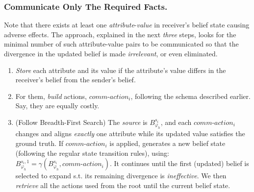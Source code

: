 \documentclass[letterpaper]{article} %
\begin{document}
    \subsubsection{Communicate Only The Required Facts.}
    Note that there exists at least one \textit{attribute}-\textit{value} in receiver's belief state causing adverse effects. 
    The approach, explained in the next \textit{three} steps, looks for the minimal number of such attribute-value pairs to be communicated so that
    the divergence in the updated belief is made \textit{irrelevant}, or even eliminated.
    \begin{enumerate}
        \item 
        \textit{Store} each attribute and its value if the attribute's value differs in the receiver's belief from the sender's belief. 
    
        \item For them, \textit{build} actions, $\textit{comm-action}_i$, following the schema described earlier. Say, they are equally costly.  
        
        \item 
        (Follow Breadth-First Search) 
        The \textit{source} is $B_{\varphi_h}^{s_i}$, and each $\textit{comm-action}_i$ changes and aligns \textit{exactly} one attribute while its updated value satisfies the ground truth. If $\textit{comm-action}_i$ is applied, generates a new belief state (following the regular state transition rules), using: $B_{\varphi_h}^{s_i,1} = \gamma(B_{\varphi_h}^{s_i}, \textit{comm-action}_i)$.
        It continues until the first (updated) belief is selected to expand s.t. its remaining divergence is \textit{ineffective}. We then \textit{retrieve} all the actions used from the root until the current belief state.   
    \end{enumerate}

\end{document}
